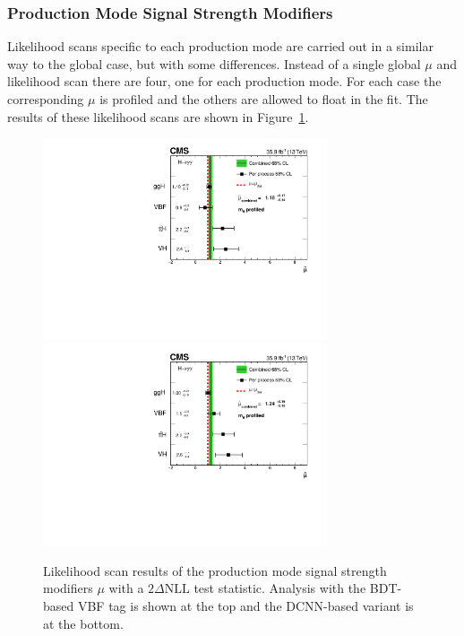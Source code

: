 \subsubsection{Production Mode Signal Strength Modifiers}
Likelihood scans specific to each production mode are carried out in a similar way to the global case, but with some differences. 
Instead of a single global $\mu$ and likelihood scan there are four, one for each production mode. 
For each case the corresponding $\mu$ is profiled and the others are allowed to float in the fit. 
The results of these likelihood scans are shown in Figure~\ref{fig:stats_results:prod_mu_scans}. 
\begin{figure}[h!]
    \begin{center}
        \includegraphics[width=0.75\textwidth]{figures/stats_results/CMS-HIG-16-040_Figure_017.pdf}
        \includegraphics[width=0.75\textwidth]{figures/stats_results/PerProcessMuProfileMH.pdf}
    \end{center}
    \caption{Likelihood scan results of the production mode signal strength modifiers $\mu$ with a $2\Delta{\mathrm{NLL}}$ test statistic. Analysis with the BDT-based VBF tag is shown at the top and the DCNN-based variant is at the bottom.}
        \label{fig:stats_results:prod_mu_scans}
\end{figure}

